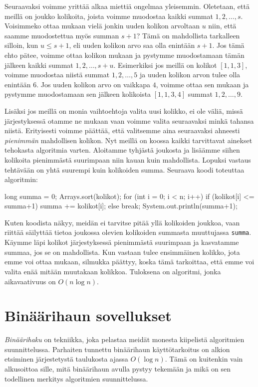 Seuraavaksi voimme yrittää alkaa miettiä ongelmaa yleisemmin.
Oletetaan, että meillä on joukko kolikoita,
joista voimme muodostaa kaikki summat $1,2,\dots,s$.
Voisimmeko ottaa mukaan vielä jonkin uuden kolikon arvoltaan $u$ niin,
että saamme muodostettua myös summan $s+1$?
Tämä on mahdollista tarkalleen silloin, kun $u \le s+1$,
eli uuden kolikon arvo saa olla enintään $s+1$.
Jos tämä ehto pätee, voimme ottaa kolikon mukaan ja
pystymme muodostamaan tämän jälkeen kaikki summat $1,2,\dots,s+u$.
Esimerkiksi jos meillä on kolikot $[1,1,3]$, voimme muodostaa
niistä summat $1,2,\dots,5$ ja uuden kolikon arvon tulee olla enintään $6$.
Jos uuden kolikon arvo on vaikkapa $4$, voimme ottaa sen mukaan ja
pystymme muodostamaan sen jälkeen kolikoista $[1,1,3,4]$ summat $1,2,\dots,9$.

Lisäksi jos meillä on monia vaihtoehtoja valita uusi kolikko,
ei ole väliä, missä järjestyksessä otamme ne mukaan vaan
voimme valita seuraavaksi minkä tahansa niistä.
Erityisesti voimme päättää, että valitsemme aina
seuraavaksi ahneesti \emph{pienimmän} mahdollisen kolikon.
Nyt meillä on koossa kaikki tarvittavat ainekset
tehokasta algoritmia varten.
Aloitamme tyhjästä joukosta ja lisäämme siihen kolikoita
pienimmästä suurimpaan niin kauan kuin mahdollista.
Lopuksi vastaus tehtävään on yhtä suurempi kuin kolikoiden
summa.
Seuraava koodi toteuttaa algoritmin:

\begin{code}
long summa = 0;
Arrays.sort(kolikot);
for (int i = 0; i < n; i++) {
    if (kolikot[i] <= summa+1) {
        summa += kolikot[i];
    } else {
        break;
    }
}
System.out.println(summa+1);
\end{code}

Kuten koodista näkyy, meidän ei tarvitse pitää yllä
kolikoiden joukkoa, vaan riittää säilyttää tietoa
joukossa olevien kolikoiden summasta muuttujassa \texttt{summa}.
Käymme läpi kolikot järjestyksessä pienimmästä suurimpaan
ja kasvatamme summaa, jos se on mahdollista.
Kun vastaan tulee ensimmäinen kolikko, jota emme voi ottaa mukaan,
silmukka päättyy, koska tämä tarkoittaa,
että emme voi valita enää mitään muutakaan kolikkoa.
Tuloksena on algoritmi, jonka aikavaativuus on $O(n \log n)$.

\section{Binäärihaun sovellukset}

\emph{Binäärihaku} on tekniikka, joka pelastaa meidät monesta
kiipelistä algoritmien suunnittelussa.
Parhaiten tunnettu binäärihaun käyttötarkoitus on alkion
etsiminen järjestetystä taulukosta ajassa $O(\log n)$.
Tämä on kuitenkin vain alkusoittoa sille,
mitä binäärihaun avulla pystyy tekemään ja mikä on sen
todellinen merkitys algoritmien suunnittelussa.

